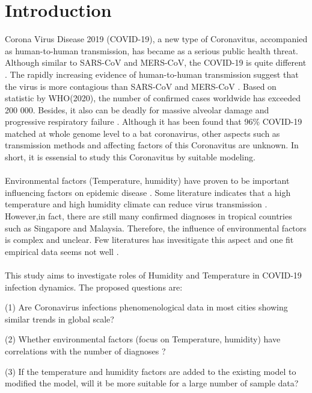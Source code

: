 \documentclass[11pt]{article}
\begin{document}
\section{Introduction}  
Corona Virus Disease 2019 (COVID-19), a new type of Coronavitus, accompanied as human-to-human transmission,  has became as a serious public health threat. Although similar to SARS-CoV and MERS-CoV, the COVID-19 is quite different \citep{R6, R7, R8}. The rapidly increasing evidence of human-to-human transmission suggest that the virus is more contagious than SARS-CoV and MERS-CoV \citep{R11}. Based on statistic by WHO(2020), the number of confirmed cases worldwide has exceeded 200 000. Besides, it also can be deadly for massive alveolar damage and progressive respiratory failure \citep{R11}. Although it has been found that 96\%  COVID-19 matched at whole genome level to a bat coronavirus\citep{R14}, other aspects such as transmission methods and affecting factors of this Coronavitus are unknown. In short, it is essensial to study this Coronavitus by suitable modeling.

\paragraph{} Environmental factors  (Temperature, humidity) have proven to be important influencing factors on epidemic disease \citep{R1}.  Some literature indicates that a high temperature and high humidity climate can reduce virus transmission  \citep{R3} . However,in fact, there are still many confirmed diagnoses in tropical countries such as Singapore and Malaysia. Therefore, the influence of environmental factors is complex and unclear. Few literatures has invesitigate this aspect and one fit empirical data seems not well  \citep{R1}.

\paragraph{} This study aims to investigate roles of Humidity and Temperature in COVID-19 infection dynamics. The proposed questions are:

(1) Are Coronavirus infections phenomenological data in most cities showing similar trends in global scale? 

(2) Whether environmental factors (focus on Temperature, humidity) have correlations with the number of diagnoses ? 

(3) If the temperature and humidity factors are added to the existing model to modified the model, will it be more suitable for a large number of sample data?
\end{document}
